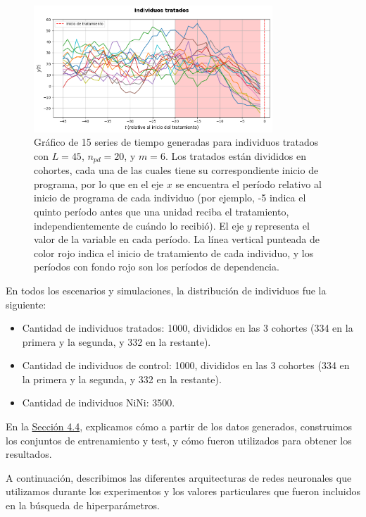 \documentclass[../../main.tex]{subfiles}
\begin{document}
\begin{figure}[ht]
    \centering
    \includegraphics[width=0.8\textwidth]{figs/tratados_exp1_sim13.png}
    \caption{Gráfico de 15 series de tiempo generadas para individuos tratados con
    \(L=45\), \(n_{pd}=20\), y \(m=6\). Los tratados están divididos en cohortes, cada una
    de las cuales tiene su correspondiente inicio de programa, por lo que en el eje \(x\)
    se encuentra el período relativo al inicio de programa de cada individuo (por ejemplo,
    -5 indica el quinto período antes que una unidad reciba el tratamiento,
    independientemente de cuándo lo recibió). El eje \(y\) representa el valor de la
    variable en cada período. La línea vertical punteada de color rojo indica el inicio de
    tratamiento de cada individuo, y los períodos con fondo rojo son los períodos de
    dependencia.}
    \label{fig:treated_series_example}
\end{figure}

En todos los escenarios y simulaciones, la distribución de individuos fue la siguiente:
\begin{itemize}[noitemsep]
    \item Cantidad de individuos tratados: 1000, divididos en las 3 cohortes (334 en la
    primera y la segunda, y 332 en la restante).
    \item Cantidad de individuos de control: 1000, divididos en las 3 cohortes (334 en la
    primera y la segunda, y 332 en la restante).
    \item Cantidad de individuos NiNi: 3500.
\end{itemize}

En la \hyperref[sec:comparacion]{Sección 4.4}, explicamos cómo a partir de los datos
generados, construimos los conjuntos de entrenamiento y test, y cómo fueron utilizados
para obtener los resultados.

A continuación, describimos las diferentes arquitecturas de redes neuronales que
utilizamos durante los experimentos y los valores particulares que fueron incluidos en la
búsqueda de hiperparámetros.
\end{document}
